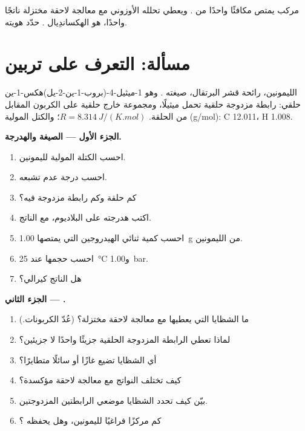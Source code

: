 \begin{exercise}[$\star\star\star$]\label{exo:b2:alkene-redox:12}
مركب  يمتص مكافئًا واحدًا من . ويعطي تحلله الأوزوني مع معالجة لاحقة
مختزلة ناتجًا واحدًا، هو الهكساندِيال . حدّد هويته.
\end{exercise}

\section{مسألة: التعرف على تربين}

\begin{problem}
\label{pb:b2:alkene-redox:1}
الليمونين، رائحة قشر البرتقال، صيغته . وهو
1-ميثيل-4-(بروب-1-ين-2-يل)هكس-1-ين حلقي: رابطة مزدوجة حلقية تحمل ميثيلًا، ومجموعة
 خارج حلقية على الكربون المقابل من الحلقة. $R =
\qty{8.314}{J/(K.mol)}$؛ والكتل المولية (\unit{g/mol}): C 12.011، H 1.008.

\medskip
\noindent\textbf{الجزء الأول --- الصيغة والهدرجة.}
\begin{enumerate}
  \item احسب الكتلة المولية لليمونين.
  \item احسب درجة عدم تشبعه.
  \item كم حلقة وكم رابطة مزدوجة فيه؟
  \item اكتب هدرجته على البلاديوم، مع الناتج.
  \item احسب كمية ثنائي الهيدروجين التي يمتصها \qty{1.00}{g} من الليمونين.
  \item احسب حجمها عند \qty{25}{\degreeCelsius} و\qty{1.00}{bar}.
  \item هل الناتج كيرالي؟
\end{enumerate}

\medskip
\noindent\textbf{الجزء الثاني --- .}
\begin{enumerate}[resume]
  \item ما الشظايا التي يعطيها  مع معالجة لاحقة مختزلة؟ (عُدّ الكربونات.)
  \item لماذا تعطي الرابطة المزدوجة الحلقية جزيئًا واحدًا لا جزيئين؟
  \item أي الشظايا تضيع غازًا أو سائلًا متطايرًا؟
  \item كيف تختلف النواتج مع معالجة لاحقة مؤكسدة؟
  \item بيّن كيف تحدد الشظايا موضعي الرابطتين المزدوجتين.
  \item كم مركزًا فراغيًا لليمونين، وهل يحفظه ؟
\end{enumerate}


\end{problem}
